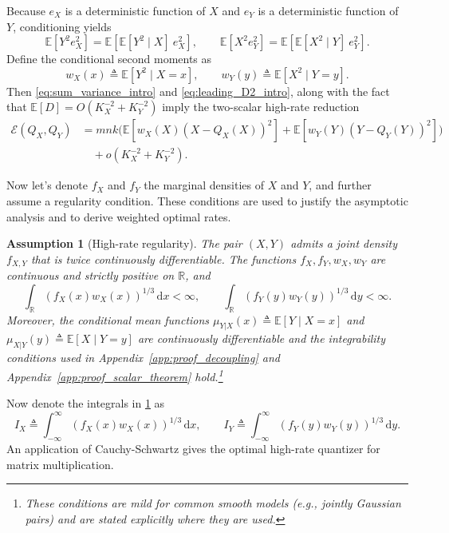\documentclass{article}
\newtheorem{assumption}{Assumption}
\newcommand{\E}{\mathbb{E}}
\newcommand{\R}{\mathbb{R}}
\newcommand{\dd}{\,\mathrm{d}}
\newcommand{\defeq}{\triangleq}
\begin{document}
Because $e_X$ is a deterministic function of $X$ and $e_Y$ is a deterministic function of $Y$, conditioning yields
\[
\E[Y^2e_X^2]=\E\!\left[\E[Y^2\mid X]\ e_X^2\right],\qquad
\E[X^2e_Y^2]=\E\!\left[\E[X^2\mid Y]\ e_Y^2\right].
\]
Define the conditional second moments as
\begin{equation}\label{eq:weights_def_intro}
w_X(x)\defeq \E[Y^2\mid X=x],\qquad
w_Y(y)\defeq \E[X^2\mid Y=y].
\end{equation}
Then \eqref{eq:sum_variance_intro} and \eqref{eq:leading_D2_intro}, along with the fact that $\E[D] = O(K_X^{-2} + K_Y^{-2})$ imply the two-scalar high-rate reduction
\begin{align}\label{eq:two_scalar_intro}
\mathcal{E}(Q_X, Q_Y)
&=mnk\Big(\E[w_X(X)(X-Q_X(X))^2]+\E[w_Y(Y)(Y-Q_Y(Y))^2]\Big)\nonumber\\
&\quad + o(K_X^{-2}+K_Y^{-2}).
\end{align}

Now let's denote $f_X$ and $f_Y$ the marginal densities of $X$ and $Y$, and further assume a regularity condition. These conditions are used to justify the asymptotic analysis and to derive weighted optimal rates.

\begin{assumption}[High-rate regularity]\label{as:regularity}
The pair $(X,Y)$ admits a joint density $f_{X,Y}$ that is twice continuously differentiable.
The functions $f_X,f_Y,w_X,w_Y$ are continuous and strictly positive on $\R$, and
\[
\int_\R (f_X(x)w_X(x))^{1/3}\dd x < \infty,\qquad
\int_\R (f_Y(y)w_Y(y))^{1/3}\dd y < \infty.
\]
Moreover, the conditional mean functions $\mu_{Y|X}(x)\defeq \E[Y\mid X=x]$ and $\mu_{X|Y}(y)\defeq \E[X\mid Y=y]$ are continuously differentiable and the integrability conditions used in Appendix~\ref{app:proof_decoupling} and Appendix~\ref{app:proof_scalar_theorem} hold.\footnote{These conditions are mild for common smooth models (e.g., jointly Gaussian pairs) and are stated explicitly where they are used.}
\end{assumption}

Now denote the integrals in \cref{as:regularity} as
\begin{equation}\label{eq:IxIy_def}
I_X \defeq \int_{-\infty}^{\infty} (f_X(x)w_X(x))^{1/3}\dd x,\qquad
I_Y \defeq \int_{-\infty}^{\infty} (f_Y(y)w_Y(y))^{1/3}\dd y.
\end{equation}
An application of Cauchy-Schwartz gives the optimal high-rate quantizer for matrix multiplication.
\end{document}
